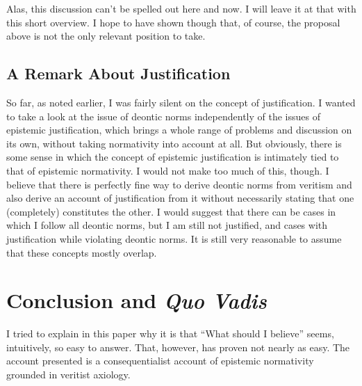 \documentclass[12pt,numbers=noenddot]{scrartcl}
\begin{document}
Alas, this discussion can't be spelled out here and now. I will leave it at that with this short overview. I hope to have shown though that, of course, the proposal above is not the only relevant position to take.

\subsection{A Remark About Justification}

So far, as noted earlier, I was fairly silent on the concept of justification. I wanted to take a look at the issue of deontic norms independently of the issues of epistemic justification, which brings a whole range of problems and discussion on its own, without taking normativity into account at all. But obviously, there is some sense in which the concept of epistemic justification is intimately tied to that of epistemic normativity.
I would not make too much of this, though. I believe that there is perfectly fine way to derive deontic norms from veritism and also derive an account of justification from it without necessarily stating that one (completely) constitutes the other. I would suggest that there can be cases in which I follow all deontic norms, but I am still not justified, and cases with justification while violating deontic norms. It is still very reasonable to assume that these concepts mostly overlap.

\section{Conclusion and \emph{Quo Vadis}}

I tried to explain in this paper why it is that “What should I believe” seems, intuitively, so easy to answer. That, however, has proven not nearly as easy. The account presented is a consequentialist account of epistemic normativity grounded in veritist axiology.
\end{document}
